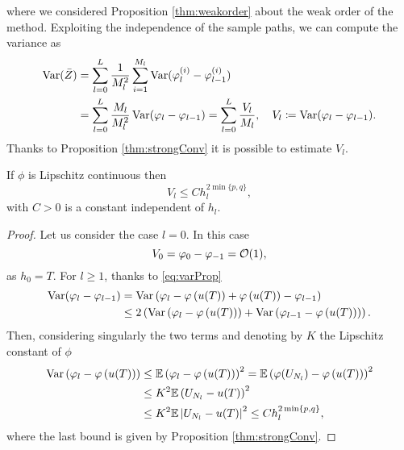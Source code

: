 where we considered Proposition \ref{thm:weakorder} about the weak order of the method. Exploiting the independence of the sample paths, we can compute the variance as
\begin{equation}
\begin{aligned}
	\operatorname{Var}(\bar Z) &= \sum_{l=0}^L \frac{1}{M_l^2} \sum_{i=1}^{M_l} \operatorname{Var}( \varphi_l^{(i)} - \varphi_{l-1}^{(i)}) \\
	&= \sum_{l=0}^L \frac{M_l}{M_l^2} \operatorname{Var}(\varphi_l - \varphi_{l-1})= \sum_{l=0}^L \frac{V_l}{M_l}, \quad V_l \coloneqq \operatorname{Var}(\varphi_l - \varphi_{l-1}).
\end{aligned}
\end{equation}
Thanks to Proposition \ref{thm:strongConv} it is possible to estimate $V_l$.
\begin{lemma} If $\phi$ is Lipschitz continuous then 
\begin{equation}
	 V_l \leq C h_l^{2\min\{p, q\}},
\end{equation}
with $C > 0$ is a constant independent of $h_l$.
\end{lemma}
\begin{proof}
Let us consider the case $l = 0$. In this case
\begin{equation}
	V_0 = \varphi_0 - \varphi_{-1} = \mathcal{O}(1),
\end{equation}
as $h_0 = T$. For $l \geq 1$, thanks to \eqref{eq:varProp}
\begin{equation}
\begin{aligned}
	\operatorname{Var}(\varphi_l - \varphi_{l-1}) &= \operatorname{Var}\left(\varphi_l - \varphi\left(u(T)\right) + \varphi\left(u(T)\right) - \varphi_{l-1}\right) \\
		&\leq 2\left(\operatorname{Var}\left(\varphi_l - \varphi\left(u(T)\right)\right) + \operatorname{Var}\left(\varphi_{l-1} - \varphi\left(u(T)\right)\right)\right).
\end{aligned}
\end{equation}
Then, considering singularly the two terms and denoting by $K$ the Lipschitz constant of $\phi$
\begin{equation}
\begin{aligned}
	\operatorname{Var}\left(\varphi_l - \varphi\left(u(T)\right)\right) &\leq \mathbb{E} \left(\varphi_l - \varphi\left(u(T)\right)\right)^2  = \mathbb{E} \left(\varphi(U_{N_l}) - \varphi\left(u(T)\right)\right)^2 \\
			&\leq K^2 \mathbb{E} \left(U_{N_l} - u(T)\right)^2  \\
			&\leq K^2 \mathbb{E}\left|U_{N_l} - u(T)\right|^2 \leq Ch_l^{2\min\{p, q\}},
\end{aligned}
\end{equation}
where the last bound is given by Proposition \ref{thm:strongConv}.
\end{proof}

